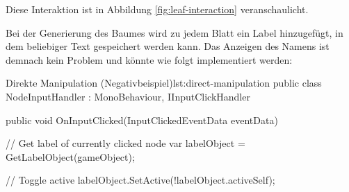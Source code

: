 Diese Interaktion ist in Abbildung \ref{fig:leaf-interaction} veranschaulicht.

Bei der Generierung des Baumes wird zu jedem Blatt ein Label hinzugefügt, in dem beliebiger Text gespeichert werden kann. Das Anzeigen des Namens ist demnach kein Problem und könnte wie folgt implementiert werden:

\begin{codesnippet}{Direkte Manipulation (Negativbeispiel)}{lst:direct-manipulation}
public class NodeInputHandler : MonoBehaviour, IInputClickHandler
{
    public void OnInputClicked(InputClickedEventData eventData)
    {
        // Get label of currently clicked node
        var labelObject = GetLabelObject(gameObject);

        // Toggle active
        labelObject.SetActive(!labelObject.activeSelf);
    }
}
\end{codesnippet}

